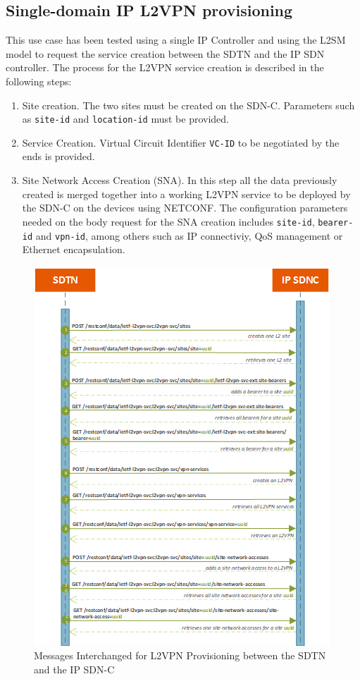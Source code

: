 \documentclass[a4paper,fleqn]{cas-dc}
\begin{document}
\subsection{Single-domain IP L2VPN provisioning}

This use case has been tested using a single IP Controller and using the L2SM model to request the service creation between the SDTN and the IP SDN controller. The process for the L2VPN service creation is described in the following steps:

\begin{enumerate}
    \item Site creation. The two sites must be created on the SDN-C. Parameters such as \texttt{site-id} and \texttt{location-id} must be provided.
    \item Service Creation. Virtual Circuit Identifier \texttt{VC-ID} to be negotiated by the ends is provided.  
    \item Site Network Access Creation (SNA). In this step all the data previously created is merged together into a working L2VPN service to be deployed by the SDN-C on the devices using NETCONF. The configuration parameters needed on the body request for the SNA creation includes \texttt{site-id}, \texttt{bearer-id} and \texttt{vpn-id}, among others such as IP connectiviy, QoS management or Ethernet encapsulation. 
\end{enumerate}

\begin{figure}
	\centering
		\includegraphics[width=\linewidth]{figs/l2sm_workflow_2.png}
	\caption{Messages Interchanged for L2VPN Provisioning between the SDTN and the IP SDN-C}
	\label{FIG:L2SM_workflow}
\end{figure}
\end{document}

